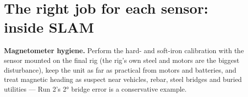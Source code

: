 

\section{The right job for each sensor: inside SLAM}

\begin{tip}
\textbf{Magnetometer hygiene.} Perform the hard- and soft-iron calibration with the sensor mounted on the final rig (the rig's own steel and motors are the biggest disturbance), keep the unit as far as practical from motors and batteries, and treat magnetic heading as suspect near vehicles, rebar, steel bridges and buried utilities --- Run 2's 2° bridge error is a conservative example.
\end{tip}
